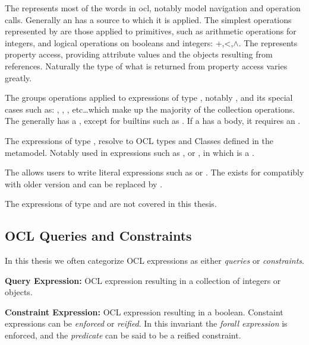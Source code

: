 The  represents most of the words in ocl, notably model navigation and operation calls.
Generally an  has a source  to which it is applied.
The simplest operations represented by  are those applied to primitives, such as arithmetic operations for integers, and logical operations on booleans and integers: +,<,$\wedge$.
The  represents property access, providing attribute values and the objects resulting from references.
Naturally the type of what is returned from property access varies greatly.

The  groups operations applied to expressions of type , notably , and its special cases such as: , , , etc\dots which make up the majority of the collection operations.
The  generally has a , except for builtins such as . 
If a  has a body, it requires an .



The expressions of type , resolve to OCL types and Classes defined in the metamodel. Notably used in expressions such as , or , in which  is a .

The  allows users to write literal expressions such as  or .
The  exists for compatibly with older version and can be replaced by .

The expressions of type  and  are not covered in this thesis.

\subsection{OCL Queries and Constraints}
In this thesis we often categorize OCL expressions as either \textit{queries} or \textit{constraints}.

\noindent \textbf{Query Expression:} 
OCL expression resulting in a collection of integers or objects.

\noindent \textbf{Constraint Expression:} 
OCL expression resulting in a boolean.
Constaint expressions can be \textit{enforced} or \textit{reified}.
In this invariant the \textit{forall expression}  is enforced, and the \textit{predicate}  can be said to be a reified constraint.

